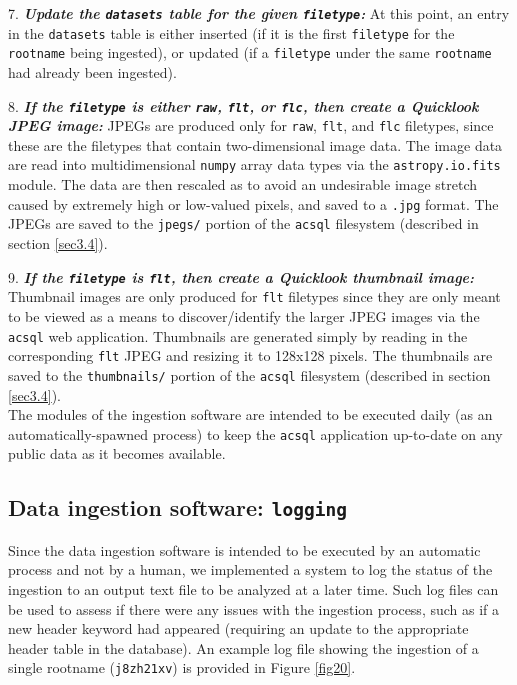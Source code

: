 \documentclass[10pt,journal,compsoc]{IEEEtran}
\begin{document}
7. \textbf{\textit{Update the \texttt{datasets} table for the given \texttt{filetype}:}} At this point, an entry in the \texttt{datasets} table is either inserted (if it is the first
\texttt{filetype} for the \texttt{rootname} being ingested), or updated (if a \texttt{filetype} under the same \texttt{rootname} had already been ingested).

8. \textbf{\textit{If the \texttt{filetype} is either \texttt{raw}, \texttt{flt}, or \texttt{flc}, then create a Quicklook JPEG image:}}  JPEGs are produced only for \texttt{raw},
\texttt{flt}, and \texttt{flc} filetypes, since these are the filetypes that contain two-dimensional image data.  The image data are read into multidimensional \texttt{numpy} array
data types via the \texttt{astropy.io.fits} module.  The data are then rescaled as to avoid an undesirable image stretch caused by extremely high or low-valued pixels, and saved to a
\texttt{.jpg} format.  The JPEGs are saved to the \texttt{jpegs/} portion of the \texttt{acsql} filesystem (described in section \ref{sec3.4}).

9. \textbf{\textit{If the \texttt{filetype} is \texttt{flt}, then create a Quicklook thumbnail image:}} Thumbnail images are only produced for \texttt{flt} filetypes since they
are only meant to be viewed as a means to discover/identify the larger JPEG images via the \texttt{acsql} web application.  Thumbnails are generated simply by reading in the corresponding
\texttt{flt} JPEG and resizing it to 128x128 pixels.  The thumbnails are saved to the \texttt{thumbnails/} portion of the \texttt{acsql} filesystem (described in section \ref{sec3.4}).\\

The modules of the ingestion software are intended to be executed daily (as an automatically-spawned process) to keep the \texttt{acsql} application up-to-date on any public data as it
becomes available.


\subsection{Data ingestion software: \texttt{logging}} \label{sec3.8}

Since the data ingestion software is intended to be executed by an automatic process and not by a human, we implemented a system to log the status of the ingestion to an output text file
to be analyzed at a later time.  Such log files can be used to assess if there were any issues with the ingestion process, such as if a new header keyword had
appeared (requiring an update to the appropriate header table in the database).  An example log file showing the ingestion of a single rootname (\texttt{j8zh21xv}) is provided in Figure
\ref{fig20}.
\end{document}
